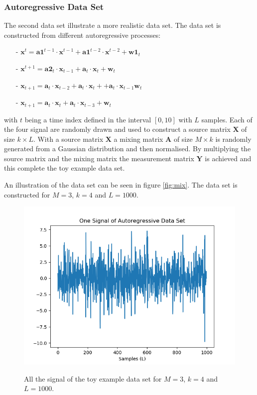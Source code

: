 \subsubsection{Autoregressive Data Set}
The second data set illustrate a more realistic data set.
The data set is constructed from different autoregressive processes: 
\begin{itemize}
\item[-] $\mathbf{x}^{t} = \mathbf{a1}^{t-1} \cdot \mathbf{x}^{t-1} + \mathbf{a1}^{t-2} \cdot \mathbf{x}^{t-2} + \mathbf{w1}_t$
\item[-] $\mathbf{x}^{t+1} = \mathbf{a2}_t \cdot \mathbf{x}_{t-1} + \mathbf{a}_t \cdot \mathbf{x}_t + \mathbf{w}_t$
\item[-] $\mathbf{x}_{t+1} = \mathbf{a}_t \cdot \mathbf{x}_{t-2} + \mathbf{a}_t \cdot \mathbf{x}_t + + \mathbf{a}_t \cdot \mathbf{x}_{t-1} \mathbf{w}_t$
\item[-] $\mathbf{x}_{t+1} = \mathbf{a}_t \cdot \mathbf{x}_t + \mathbf{a}_t \cdot \mathbf{x}_{t-3} + \mathbf{w}_t$
\end{itemize}
with $t$ being a time index defined in the interval $[0,10]$ with $L$ samples. Each of the four signal are randomly drawn and used to construct a source matrix $\mathbf{X}$ of size $k \times L$. 
With a source matrix $\mathbf{X}$ a mixing matrix $\mathbf{A}$ of size $M \times k$ is randomly generated from a Gaussian distribution and then normalised. By multiplying the source matrix and the mixing matrix the measurement matrix $\mathbf{Y}$ is achieved and this complete the toy example data set.

An illustration of the data set can be seen in figure \ref{fig:mix}. The data set is constructed for $M = 3$, $k = 4$ and $L = 1000$.
\begin{figure}[H]
\centering
\includegraphics[scale=0.5]{figures/chapter6/AR_Data_m3_n4_k4_L1000.png}
\label{fig:AR}
\caption{All the signal of the toy example data set for $M = 3$, $k=4$ and $L=1000$.}
\end{figure}
\noindent

